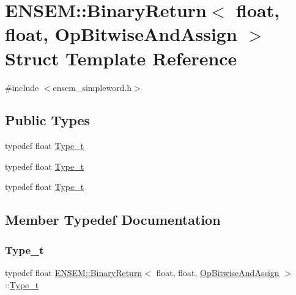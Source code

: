 \hypertarget{structENSEM_1_1BinaryReturn_3_01float_00_01float_00_01OpBitwiseAndAssign_01_4}{}\section{E\+N\+S\+EM\+:\+:Binary\+Return$<$ float, float, Op\+Bitwise\+And\+Assign $>$ Struct Template Reference}
\label{structENSEM_1_1BinaryReturn_3_01float_00_01float_00_01OpBitwiseAndAssign_01_4}


{\ttfamily \#include $<$ensem\+\_\+simpleword.\+h$>$}

\subsection*{Public Types}
\begin{DoxyCompactItemize}
\item 
typedef float \mbox{\hyperlink{structENSEM_1_1BinaryReturn_3_01float_00_01float_00_01OpBitwiseAndAssign_01_4_ad1e9a8f181e2615bea9ad008a77badf5}{Type\+\_\+t}}
\item 
typedef float \mbox{\hyperlink{structENSEM_1_1BinaryReturn_3_01float_00_01float_00_01OpBitwiseAndAssign_01_4_ad1e9a8f181e2615bea9ad008a77badf5}{Type\+\_\+t}}
\item 
typedef float \mbox{\hyperlink{structENSEM_1_1BinaryReturn_3_01float_00_01float_00_01OpBitwiseAndAssign_01_4_ad1e9a8f181e2615bea9ad008a77badf5}{Type\+\_\+t}}
\end{DoxyCompactItemize}


\subsection{Member Typedef Documentation}
\mbox{\label{structENSEM_1_1BinaryReturn_3_01float_00_01float_00_01OpBitwiseAndAssign_01_4_ad1e9a8f181e2615bea9ad008a77badf5}} 
\subsubsection{\texorpdfstring{Type\_t}{Type\_t}\hspace{0.1cm}{\footnotesize\ttfamily [1/3]}}
{\footnotesize\ttfamily typedef float \mbox{\hyperlink{structENSEM_1_1BinaryReturn}{E\+N\+S\+E\+M\+::\+Binary\+Return}}$<$ float, float, \mbox{\hyperlink{structENSEM_1_1OpBitwiseAndAssign}{Op\+Bitwise\+And\+Assign}} $>$\+::\mbox{\hyperlink{structENSEM_1_1BinaryReturn_3_01float_00_01float_00_01OpBitwiseAndAssign_01_4_ad1e9a8f181e2615bea9ad008a77badf5}{Type\+\_\+t}}}

